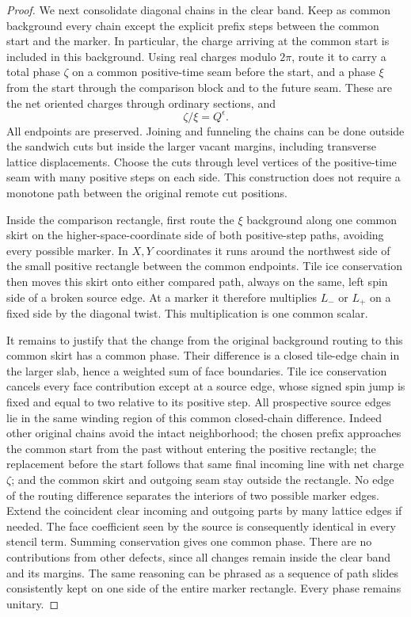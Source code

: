 \begin{proof}
We next consolidate diagonal chains in the clear band. Keep as
common background every chain except the explicit prefix
steps between the common start and the marker. In particular,
the charge arriving at the common start is included in this
background. Using real charges modulo $2\pi$, route it to carry
a total phase $\zeta$ on a common positive-time seam before
the start, and a phase $\xi$ from the start through the
comparison block and to the future seam. These are the net
oriented charges through ordinary sections, and
\[
 \zeta/\xi=Q^\epsilon.
\]
All endpoints are preserved. Joining and funneling the chains
can be done outside the sandwich cuts but inside the larger
vacant margins, including transverse lattice displacements.
Choose the cuts through level vertices of the positive-time
seam with many positive steps on each side. This construction
does not require a monotone path between the original remote
cut positions.

Inside the comparison rectangle, first route the $\xi$
background along one common skirt on the higher-space-coordinate
side of both positive-step paths, avoiding every possible
marker. In $X,Y$ coordinates it runs around the northwest side
of the small positive rectangle between the common endpoints.
Tile ice conservation then moves this skirt onto either
compared path, always on the same, left spin side of a broken
source edge. At a marker it therefore multiplies $L_-$ or
$L_+$ on a fixed side by the diagonal twist. This multiplication
is one common scalar.

It remains to justify that the change from the original
background routing to this common skirt has a common phase.
Their difference is a closed tile-edge chain in the larger
slab, hence a weighted sum of face boundaries. Tile ice
conservation cancels every face contribution except at a
source edge, whose signed spin jump is fixed and equal to
two relative to its positive step. All prospective source
edges lie in the same winding region of this common
closed-chain difference. Indeed other original chains avoid
the intact neighborhood; the chosen prefix approaches the
common start from the past without entering the positive
rectangle; the replacement before the start follows that
same final incoming line with net charge $\zeta$; and the
common skirt and outgoing seam stay outside the rectangle.
No edge of the routing difference separates the interiors
of two possible marker edges. Extend the coincident clear
incoming and outgoing parts by many lattice edges if needed.
The face coefficient seen by the source is consequently
identical in every stencil term. Summing conservation gives
one common phase. There are no contributions from other
defects, since all changes remain inside the clear band and
its margins. The same reasoning can be phrased as a sequence
of path slides consistently kept on one side of the entire
marker rectangle. Every phase remains unitary.


\end{proof}
